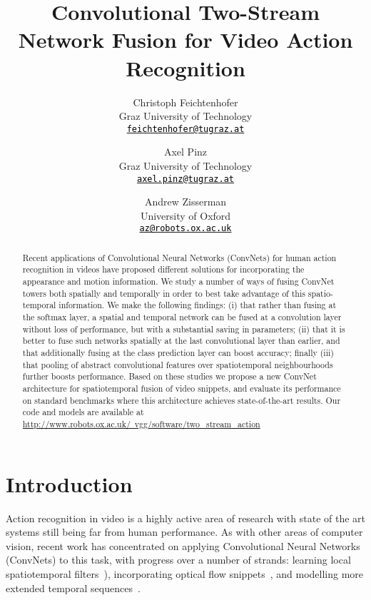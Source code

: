 \documentclass[10pt,twocolumn,letterpaper]{article}
\author{Christoph Feichtenhofer\\Graz University of Technology\\ {\tt \small \href{mailto:feichtenhofer@tugraz.at}{\textcolor{black}{feichtenhofer@tugraz.at}}} \and	Axel Pinz\\Graz University of Technology\\{\tt \small \href{mailto:axel.pinz@tugraz.at}{\textcolor{black}{axel.pinz@tugraz.at}}} \and Andrew Zisserman\\
	University of Oxford\\{\tt \small  \href{mailto:az@robots.ox.ac.uk}{\textcolor{black}{az@robots.ox.ac.uk}}}
	}
\begin{document}
\title{Convolutional Two-Stream Network Fusion for Video Action Recognition}

\maketitle

\begin{abstract}
	
Recent applications of Convolutional Neural
Networks (ConvNets) for human action recognition in videos
 have proposed different solutions for
incorporating the appearance and motion information.
We study a number of ways of fusing ConvNet towers both spatially and
temporally in order to best
take advantage of this spatio-temporal information. We make the following
findings: (i) that rather than fusing at the softmax layer,
a spatial and temporal network can be fused
at a convolution layer without loss of performance, but with a substantial
saving in parameters; (ii) that it is better to fuse such networks spatially at 
the last convolutional layer than earlier, and that additionally fusing at the class prediction layer can boost accuracy; finally (iii) that pooling of abstract convolutional features over spatiotemporal neighbourhoods further boosts performance.
Based on these studies we propose a new ConvNet architecture for spatiotemporal fusion of video snippets, and evaluate its performance on standard benchmarks where this architecture achieves state-of-the-art results.
Our code and models are available at \href{http://www.robots.ox.ac.uk/~vgg/software/two_stream_action/}{ http://www.robots.ox.ac.uk/~vgg/software/two\_stream\_action}

\vspace{-10pt}
\end{abstract}


  	\section{Introduction}
\label{sec:intro}

Action recognition in video is a highly active area of research with
state of the art systems still being far from human performance. 
As with other areas of computer vision, recent work has concentrated
on applying Convolutional Neural
Networks (ConvNets) to this task, with progress over a number of
strands: learning local spatiotemporal 
filters~\cite{Karpathy14,Taylor10,C3DICCV2015}),
incorporating optical flow
snippets~\cite{Simonyan14b}, and modelling more extended temporal 
sequences~\cite{donahue2015long,ng2015beyond}. 
\end{document}
